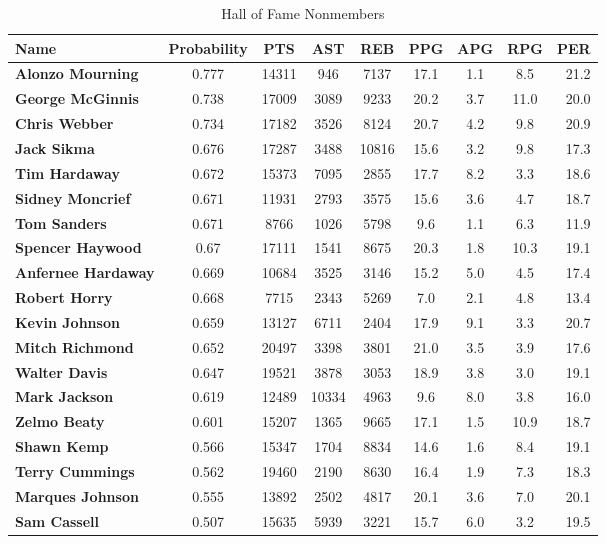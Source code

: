 \documentclass[paper=a4, fontsize=11pt]{scrartcl} %
\numberwithin{equation}{section} %
\numberwithin{figure}{section} %
\numberwithin{table}{section} %
\begin{document}
\begin{table}[thb]
\centering
\caption{\label{not_hall_of_fame}Hall of Fame Nonmembers}
\begin{tabular}{l*{7}{c}r}
Name              & Probability & PTS & AST & REB & PPG  & APG & RPG & PER \\
\hline
\textbf{Alonzo Mourning} & 0.777 & 14311 & 946 & 7137 & 17.1 & 1.1 & 8.5 & 21.2 \\
\textbf{George McGinnis} & 0.738 & 17009 & 3089 & 9233 & 20.2 & 3.7 & 11.0 & 20.0 \\
\textbf{Chris Webber} & 0.734 & 17182 & 3526 & 8124 & 20.7 & 4.2 & 9.8 & 20.9 \\
\textbf{Jack Sikma} & 0.676 & 17287 & 3488 & 10816 & 15.6 & 3.2 & 9.8 & 17.3 \\
\textbf{Tim Hardaway} & 0.672 & 15373 & 7095 & 2855 & 17.7 & 8.2 & 3.3 & 18.6 \\
\textbf{Sidney Moncrief} & 0.671 & 11931 & 2793 & 3575 & 15.6 & 3.6 & 4.7 & 18.7 \\
\textbf{Tom Sanders} & 0.671 & 8766 & 1026 & 5798 & 9.6 & 1.1 & 6.3 & 11.9 \\
\textbf{Spencer Haywood} & 0.67 & 17111 & 1541 & 8675 & 20.3 & 1.8 & 10.3 & 19.1 \\
\textbf{Anfernee Hardaway} & 0.669 & 10684 & 3525 & 3146 & 15.2 & 5.0 & 4.5 & 17.4 \\
\textbf{Robert Horry} & 0.668 & 7715 & 2343 & 5269 & 7.0 & 2.1 & 4.8 & 13.4 \\
\textbf{Kevin Johnson} & 0.659 & 13127 & 6711 & 2404 & 17.9 & 9.1 & 3.3 & 20.7 \\
\textbf{Mitch Richmond} & 0.652 & 20497 & 3398 & 3801 & 21.0 & 3.5 & 3.9 & 17.6 \\
\textbf{Walter Davis} & 0.647 & 19521 & 3878 & 3053 & 18.9 & 3.8 & 3.0 & 19.1 \\
\textbf{Mark Jackson} & 0.619 & 12489 & 10334 & 4963 & 9.6 & 8.0 & 3.8 & 16.0 \\
\textbf{Zelmo Beaty} & 0.601 & 15207 & 1365 & 9665 & 17.1 & 1.5 & 10.9 & 18.7 \\
\textbf{Shawn Kemp} & 0.566 & 15347 & 1704 & 8834 & 14.6 & 1.6 & 8.4 & 19.1 \\
\textbf{Terry Cummings} & 0.562 & 19460 & 2190 & 8630 & 16.4 & 1.9 & 7.3 & 18.3 \\
\textbf{Marques Johnson} & 0.555 & 13892 & 2502 & 4817 & 20.1 & 3.6 & 7.0 & 20.1 \\
\textbf{Sam Cassell} & 0.507 & 15635 & 5939 & 3221 & 15.7 & 6.0 & 3.2 & 19.5 \\

\end{tabular}
\end{table}
\end{document}
